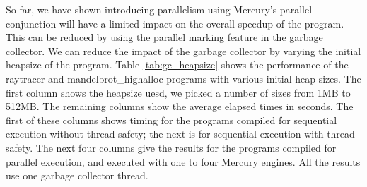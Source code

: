 


So far,
we have shown introducing parallelism using Mercury's parallel conjunction
will have a limited impact on the overall speedup of the program.
This can be reduced by using the parallel marking feature in the garbage
collector.
We can reduce the impact of the garbage collector by varying the initial
heapsize of the program.
Table \ref{tab:gc_heapsize} shows the performance of the raytracer and
mandelbrot\_highalloc programs with various initial heap sizes.
The first column shows the heapsize uesd,
we picked a number of sizes from 1MB to 512MB.
The remaining columns show the average elapsed times in seconds.
The first of these columns shows timing for the programs compiled for
sequential execution without thread safety;
the next is for sequential execution with thread safety.
The next four columns give the results for the programs compiled for
parallel execution, and executed with one to four Mercury engines.
All the results use one garbage collector thread.



